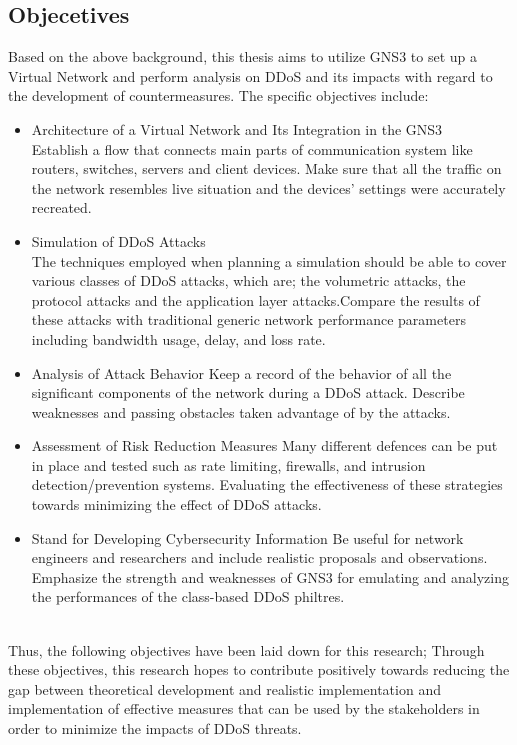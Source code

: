 \subsection{Objecetives}
Based on the above background, this thesis aims to utilize GNS3 to set up a Virtual Network and perform analysis on DDoS and its impacts with regard to the development of countermeasures. The specific objectives include:
\begin{itemize}
\item Architecture of a Virtual Network and Its Integration in the GNS3
\\
Establish a flow that connects main parts of communication system like routers, switches, servers and client devices.
Make sure that all the traffic on the network resembles live situation and the devices’ settings were accurately recreated.
\item Simulation of DDoS Attacks
\\
The techniques employed when planning a simulation should be able to cover various classes of DDoS attacks, which are; the volumetric attacks, the protocol attacks and the application layer attacks.Compare the results of these attacks with traditional generic network performance parameters including bandwidth usage, delay, and loss rate.
\item Analysis of Attack Behavior
Keep a record of the behavior of all the significant components of the network during a DDoS attack.
Describe weaknesses and passing obstacles taken advantage of by the attacks.
\item Assessment of Risk Reduction Measures
Many different defences can be put in place and tested such as rate limiting, firewalls, and intrusion detection/prevention systems. Evaluating the effectiveness of these strategies towards minimizing the effect of DDoS attacks.
\item Stand for Developing Cybersecurity Information
Be useful for network engineers and researchers and include realistic proposals and observations.
Emphasize the strength and weaknesses of GNS3 for emulating and analyzing the performances of the class-based DDoS philtres.
\end{itemize}
\\
Thus, the following objectives have been laid down for this research; Through these objectives, this research hopes to contribute positively towards reducing the gap between theoretical development and realistic implementation and implementation of effective measures that can be used by the stakeholders in order to minimize the impacts of DDoS threats.